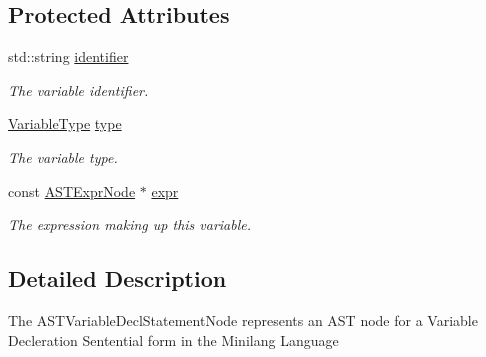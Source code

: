 \subsection*{Protected Attributes}
\begin{DoxyCompactItemize}
\item 
\mbox{\label{classparser_1_1ast_1_1ASTVariableDeclStamentNode_a998b3de9773131301fc68f7d053ff4b3}} 
std\+::string \hyperlink{classparser_1_1ast_1_1ASTVariableDeclStamentNode_a998b3de9773131301fc68f7d053ff4b3}{identifier}
\begin{DoxyCompactList}\small\item\em The variable identifier. \end{DoxyCompactList}\item 
\mbox{\label{classparser_1_1ast_1_1ASTVariableDeclStamentNode_af7926565361da558b12fe6d1acdc1a1d}} 
\hyperlink{ASTVariableDeclStamentNode_8h_a1e8e1bde0729627e3a22ffa858d5f3b9}{Variable\+Type} \hyperlink{classparser_1_1ast_1_1ASTVariableDeclStamentNode_af7926565361da558b12fe6d1acdc1a1d}{type}
\begin{DoxyCompactList}\small\item\em The variable type. \end{DoxyCompactList}\item 
\mbox{\label{classparser_1_1ast_1_1ASTVariableDeclStamentNode_a59f706f678b436b518652776a9593ae7}} 
const \hyperlink{classparser_1_1ast_1_1ASTExprNode}{A\+S\+T\+Expr\+Node} $\ast$ \hyperlink{classparser_1_1ast_1_1ASTVariableDeclStamentNode_a59f706f678b436b518652776a9593ae7}{expr}
\begin{DoxyCompactList}\small\item\em The expression making up this variable. \end{DoxyCompactList}\end{DoxyCompactItemize}


\subsection{Detailed Description}
The A\+S\+T\+Variable\+Decl\+Statement\+Node represents an A\+ST node for a Variable Decleration Sentential form in the Minilang Language 

